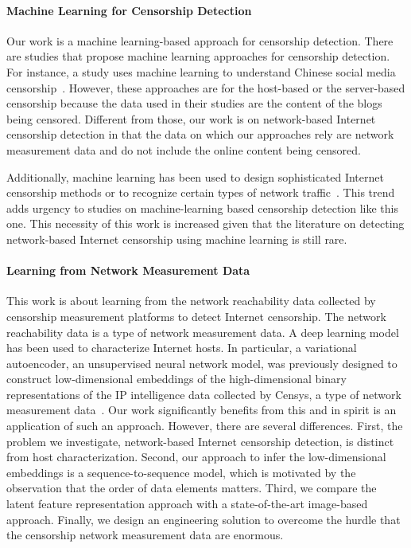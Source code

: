 \paragraph{Machine Learning for Censorship Detection}
Our work is a machine learning-based approach for censorship detection. There are
studies that propose machine learning approaches for censorship
detection. For instance, a study uses machine learning to understand Chinese
social media censorship~\cite{li2015predicting}.  However, these approaches are
for the host-based or the server-based censorship because the data used in
their studies are the content of the blogs being censored.  Different from
those, our work is on network-based Internet censorship detection in that the
data on which our approaches rely are network measurement data and do not include
the online content being censored.

Additionally, machine learning has been used to design sophisticated
Internet censorship methods or to recognize certain types of network
traffic~\cite{gao2021machine, trivedi2016fully}. This trend adds urgency to studies
on machine-learning based censorship detection like this one. This necessity of this
work is increased given that the literature on detecting
network-based Internet censorship using machine learning is still rare.


\paragraph{Learning from Network Measurement Data}
This work is about learning from the network reachability data collected by
censorship measurement platforms to detect Internet censorship. The network
reachability data is a type of network measurement data. A deep learning model
has been used to characterize Internet hosts. In particular, a variational
autoencoder, an unsupervised neural network model, was previously designed to construct
low-dimensional embeddings of the high-dimensional binary representations of
the IP intelligence data collected by Censys, a type of network measurement
data~\cite{sarabi_characterizing_2018}.  Our work significantly
benefits from this and in spirit is an application of such an approach. 
However, there are
several differences.  First, the problem we investigate, network-based
Internet censorship detection, is distinct from host characterization. Second, our
approach to infer the low-dimensional embeddings is a sequence-to-sequence
model, which is motivated by the observation that the order of data elements
matters. Third, we compare the latent feature representation approach with a
state-of-the-art image-based approach. Finally, we design an engineering
solution to overcome the hurdle that the censorship network 
measurement data are enormous.  




